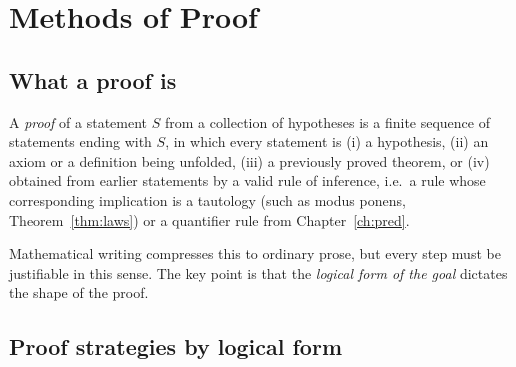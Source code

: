 \chapter{Methods of Proof}\label{ch:proof}

\section{What a proof is}

\begin{definition}[Proof]
	A \emph{proof} of a statement $S$ from a collection of hypotheses is a finite sequence of statements ending with $S$, in which every statement is (i) a hypothesis, (ii) an axiom or a definition being unfolded, (iii) a previously proved theorem, or (iv) obtained from earlier statements by a valid rule of inference, i.e.\ a rule whose corresponding implication is a tautology (such as modus ponens, Theorem~\ref{thm:laws}) or a quantifier rule from Chapter~\ref{ch:pred}.
\end{definition}

Mathematical writing compresses this to ordinary prose, but every step must be justifiable in this sense. The key point is that the \emph{logical form of the goal} dictates the shape of the proof.

\section{Proof strategies by logical form}

